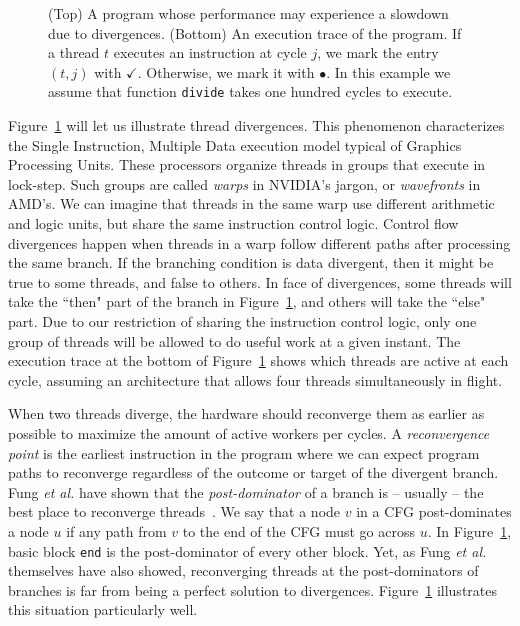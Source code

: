 \documentclass[times,10pt,twocolumn]{article}
\begin{document}
\begin{figure}[b!]
\begin{center}
\begin{small}
\end{small}
\end{center}
\caption{(Top) A program whose performance may experience a slowdown due to divergences.
(Bottom) An execution trace of the program.
If a thread $t$ executes an instruction at cycle
$j$, we mark the entry $(t, j)$ with $\checkmark$.
Otherwise, we mark it with $\bullet$.
In this example we assume that function \texttt{divide} takes one hundred
cycles to execute.}
\label{fig:exampleOrig}
\end{figure}

Figure~\ref{fig:exampleOrig} will let us illustrate thread divergences.
This phenomenon characterizes the Single Instruction, Multiple Data
execution model typical of Graphics Processing Units.
These processors organize threads in groups that execute in lock-step.
Such groups are called {\em warps} in NVIDIA's jargon, or {\em wavefronts} in
AMD's.
We can imagine that threads in the same warp use different arithmetic and
logic units, but share the same instruction control logic.
Control flow divergences happen when threads
in a warp follow different paths after processing the same branch.
If the branching condition is data divergent, then it might be true to some
threads, and false to others.
In face of divergences, some threads will take the ``then" part of the branch
in Figure~\ref{fig:exampleOrig}, and others will take the ``else" part.
Due to our restriction of sharing the instruction control logic, only one group
of threads will be allowed to do useful work at a given instant.
The execution trace at the bottom of Figure~\ref{fig:exampleOrig} shows
which threads are active at each cycle, assuming an architecture that allows
four threads simultaneously in flight.

When two threads diverge, the hardware should reconverge them as earlier as
possible to maximize the amount of active workers per cycles.
A {\em reconvergence point} is the earliest instruction in the program where we
can expect program paths to reconverge  regardless of the outcome or target of
the divergent branch.
Fung {\em et al.} have shown that the {\em post-dominator} of a branch is --
usually -- the best place to reconverge threads~\cite{Fung07}.
We say that a node $v$ in a CFG post-dominates a node $u$ if any path from $v$
to the end of the CFG must go across $u$.
In Figure~\ref{fig:exampleOrig}, basic block \texttt{end} is the post-dominator
of every other block.
Yet, as Fung {\em et al.} themselves have also showed, reconverging threads at the
post-dominators of branches is far from being a perfect solution to divergences.
Figure~\ref{fig:exampleOrig} illustrates this situation particularly well.
\end{document}
